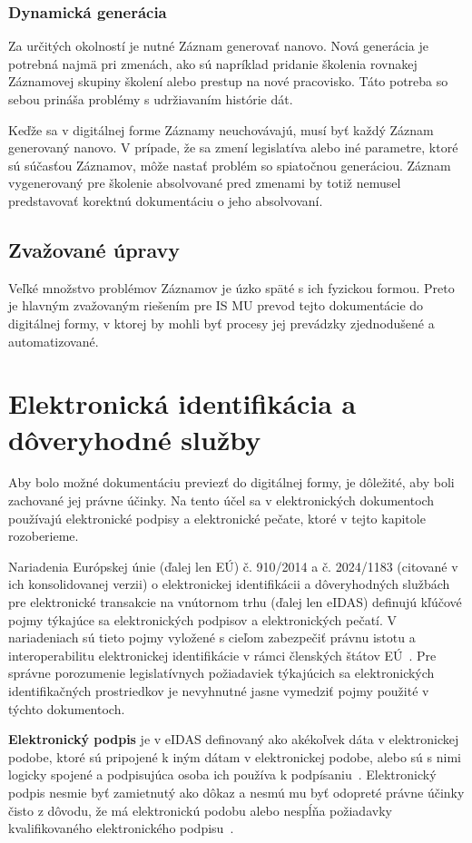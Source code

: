 \documentclass[
  digital,     %
  oneside,     %
  nosansbold,  %
  nocolorbold, %
  lof,         %
  nolot,         %
]{fithesis4}
\begin{document}
\subsection*{Dynamická generácia}
Za určitých okolností je nutné Záznam generovať nanovo. Nová generácia je potrebná najmä pri zmenách, ako sú napríklad pridanie školenia rovnakej Záznamovej skupiny školení alebo prestup na nové pracovisko. Táto potreba so sebou prináša problémy s udržiavaním histórie dát.

Keďže sa v digitálnej forme Záznamy neuchovávajú, musí byť každý Záznam generovaný nanovo. V prípade, že sa zmení legislatíva alebo iné parametre, ktoré sú súčasťou Záznamov, môže nastať problém so spiatočnou generáciou. Záznam vygenerovaný pre školenie absolvované pred zmenami by totiž nemusel predstavovať korektnú dokumentáciu o jeho absolvovaní.

\section{Zvažované úpravy}
Veľké množstvo problémov Záznamov je úzko späté s ich fyzickou formou. Preto je hlavným zvažovaným riešením pre IS MU prevod tejto dokumentácie do digitálnej formy, v ktorej by mohli byť procesy jej prevádzky zjednodušené a automatizované.


\chapter{Elektronická identifikácia a dôveryhodné služby}
\label{kap-4}
Aby bolo možné dokumentáciu previezť do digitálnej formy, je dôležité, aby boli zachované jej právne účinky. Na tento účel sa v elektronických dokumentoch používajú elektronické podpisy a elektronické pečate, ktoré v tejto kapitole rozoberieme.

Nariadenia Európskej únie (ďalej len EÚ) č. 910/2014 a č. 2024/1183 (citované v ich konsolidovanej verzii) o elektronickej identifikácii a dôveryhodných službách pre elektronické transakcie na vnútornom trhu (ďalej len eIDAS) definujú kľúčové pojmy týkajúce sa elektronických podpisov a elektronických pečatí. V nariadeniach sú tieto pojmy vyložené s cieľom zabezpečiť právnu istotu a interoperabilitu elektronickej identifikácie v rámci členských štátov EÚ~\cite{eidas2024}. Pre správne porozumenie legislatívnych požiadaviek týkajúcich sa elektronických identifikačných prostriedkov je nevyhnutné jasne vymedziť pojmy použité v týchto dokumentoch.

\textbf{Elektronický podpis} je v eIDAS definovaný ako akékoľvek dáta v elektronickej podobe, ktoré sú pripojené k iným dátam v elektronickej podobe, alebo sú s nimi logicky spojené a podpisujúca osoba ich používa k podpísaniu~\cite[čl.~3,~odst.~10]{eidas2024}. Elektronický podpis nesmie byť zamietnutý ako dôkaz a nesmú mu byť odopreté právne účinky čisto z dôvodu, že má elektronickú podobu alebo nespĺňa požiadavky kvalifikovaného elektronického podpisu~\cite[čl.~25,~odst.~1]{eidas2024}.
\end{document}
